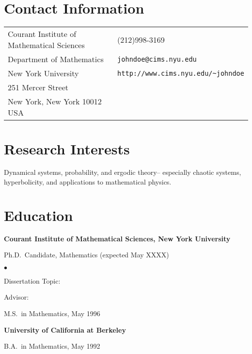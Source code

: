 \documentclass[margin,line,pifont,palatino,courier]{res}
\newenvironment{list1}{
  \begin{list}{\ding{113}}{%
      \setlength{\itemsep}{0in}
      \setlength{\parsep}{0in} \setlength{\parskip}{0in}
      \setlength{\topsep}{0in} \setlength{\partopsep}{0in}
      \setlength{\leftmargin}{0.17in}}}{\end{list}}
\newenvironment{list2}{
  \begin{list}{$\bullet$}{%
      \setlength{\itemsep}{0in}
      \setlength{\parsep}{0in} \setlength{\parskip}{0in}
      \setlength{\topsep}{0in} \setlength{\partopsep}{0in}
      \setlength{\leftmargin}{0.2in}}}{\end{list}}
\begin{document}

\begin{resume}

\section{\sc Contact Information}

\vspace{.05in}
\begin{tabular}{@{}p{2.75in}p{2in}}
Courant Institute of Mathematical Sciences & (212)998-3169 \\
Department of Mathematics                        & \verb+johndoe@cims.nyu.edu+\\
New York University                  & \verb+http://www.cims.nyu.edu/~johndoe+\\
251 Mercer Street               & \\
New York, New York 10012 USA               & \\
\end{tabular}

\section{\sc Research Interests}
Dynamical systems, probability, and ergodic theory-- especially
chaotic systems, hyperbolicity, and applications to mathematical
physics.

\section{\sc Education}

{\bf Courant Institute of Mathematical Sciences, New York University}\\
\vspace*{-.1in}
\begin{list1}
\item[] Ph.D.~Candidate, Mathematics (expected May XXXX)

\begin{list2}
\vspace*{.05in}
\item Dissertation Topic:  
\item Advisor: 
\end{list2}
\item[] M.S.~in Mathematics, May 1996
\end{list1}

{\bf University of California at Berkeley}\\
\vspace*{-.1in}
\begin{list1}
\item[] B.A.~in Mathematics, May 1992


\end{list1}
\end{resume}
\end{document}
